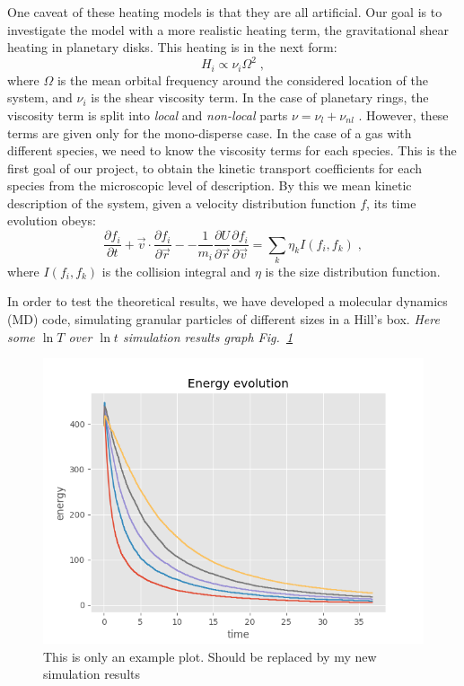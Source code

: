 \documentclass[11pt, notitlepage]{article} %
\begin{document}
One caveat of these heating models is that they are all artificial. Our goal 
is to investigate the model with a more realistic heating term, the gravitational 
shear heating in planetary disks. This heating is in the next form:
\begin{equation}
	H_i \propto \nu_i\Omega^2\;,
\end{equation}
where $\Omega$ is the mean orbital frequency around the considered location of the system,
and $\nu_i$ is the shear viscosity term. In the case of planetary rings, the viscosity
term is split into \emph{local} and \emph{non-local} parts $\nu=\nu_l+\nu_{nl}$ 
\cite{Seiss2011,spahn2006c,Stewart1984}.
However, these terms are given only for the mono-disperse case. In the case of a gas 
with different species, we need to know the viscosity terms for each species. 
This is the first goal of our project, to obtain the kinetic transport coefficients
for each species from the microscopic level of description. 
By this we mean kinetic description of the system, given a velocity distribution 
function $f$, its time evolution obeys:
\begin{equation}
	\frac{\partial f_i}{\partial t}+\vec{v}\cdot\frac{\partial f_i}{\partial\vec{r}}-
	-\frac{1}{m_i}\frac{\partial U}{\partial\vec{r}}\frac{\partial f_i}{\partial\vec{v}}=
	\sum_k\eta_kI(f_i,f_k)\;,
\end{equation}
where $I(f_i, f_k)$ is the collision integral and $\eta$ is the size distribution 
function.

In order to test the theoretical results, we have developed a molecular dynamics (MD) 
code, simulating granular particles of different sizes in a Hill's box. 
\emph{Here some $\ln T$ over $\ln t$ simulation results graph Fig.~\ref{fig2}}
\begin{figure}[h] %
	\centering
	\includegraphics[scale = .80]{Figures/energy_evo.png}
	\caption{\footnotesize This is only an example plot. Should be replaced by my new simulation results}
	\label{fig2}
\end{figure}
\end{document}
